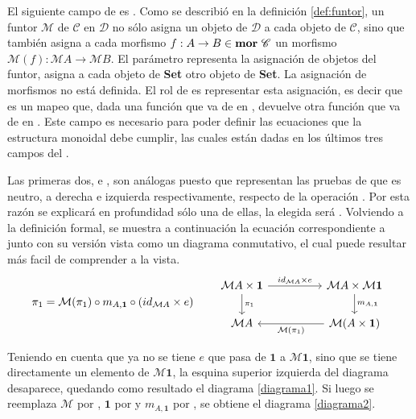 El siguiente campo de  es . Como se describió en la definición \ref{def:funtor}, un funtor $\mathcal{M}$ de $\mathscr{C}$ en $\mathscr{D}$ no sólo asigna un objeto de $\mathscr{D}$ a cada objeto de $\mathscr{C}$, sino que también asigna a cada morfismo $f : A \rightarrow B \in \text{\bf mor} \ \mathscr{C}$ un morfismo $\mathcal{M}(f) : \mathcal{M} A \rightarrow \mathcal{M} B$. El parámetro  representa la asignación de objetos del funtor, asigna a cada objeto de \textbf{Set} otro objeto de \textbf{Set}. La asignación de morfismos no está definida. El rol de  es representar esta asignación, es decir que es un mapeo que, dada una función que va de  en , devuelve otra función que va de  en . Este campo es necesario para poder definir las ecuaciones que la estructura monoidal debe cumplir, las cuales están dadas en los últimos tres campos del .

Las primeras dos,  e , son análogas puesto que representan las pruebas de que  es neutro, a derecha e izquierda respectivamente, respecto de la operación . Por esta razón se explicará en profundidad sólo una de ellas, la elegida será . Volviendo a la definición formal, se muestra a continuación la ecuación correspondiente a  junto con su versión vista como un diagrama conmutativo, el cual puede resultar más facil de comprender a la vista.
\begin{equation*}
\pi_1 = \mathcal{M}(\pi_1) \circ m_{A,\mathbf{1}} \circ (id_{\mathcal{M}A} \times e) 
\qquad 
\begin{tikzcd}[column sep = huge]
\mathcal{M} A \times \mathbf{1} \arrow[d, "\pi_1"] \arrow[r, "id_{\mathcal{M} A} \times e"] & \mathcal{M} A \times \mathcal{M} \mathbf{1} \arrow[d, "m_{A,\mathbf{1}}"]  \\
\mathcal{M} A & \mathcal{M} (A \times \mathbf{1}) \arrow[l, "\mathcal{M}(\pi_1)"]
\end{tikzcd}
\end{equation*}

Teniendo en cuenta que ya no se tiene $e$ que pasa de $\mathbf{1}$ a $\mathcal{M} \mathbf{1}$, sino que se tiene directamente un elemento de $\mathcal{M} \mathbf{1}$, la esquina superior izquierda del diagrama desaparece, quedando como resultado el diagrama \ref{diagrama1}. Si luego se reemplaza $\mathcal{M}$ por , $\mathbf{1}$ por \AgdaDatatype{$\top$} y $m_{A,\mathbf{1}}$ por , se obtiene el diagrama \ref{diagrama2}. 
\vspace{-1.25\baselineskip}

